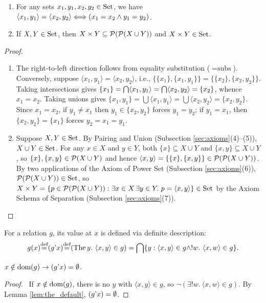 \documentclass[10pt,a4paper]{article}
\renewcommand{\myprf}{\begin{proof}}
\renewcommand{\myqed}{\end{proof}}
\begin{document}
\begin{lemma}\label{lem:pair_prop}
\begin{enumerate}
\item For any sets $x_1, y_1, x_2, y_2 \in {\textrm{Set}}$, we have $\langle x_1, y_1 \rangle = \langle x_2, y_2 \rangle \Longleftrightarrow (x_1 = x_2 \land y_1 = y_2)$.
\item If $X, Y \in {\textrm{Set}}$, then $X \times Y \subseteq {\mathcal{P}}({\mathcal{P}}(X \cup Y))$ and $X \times Y \in {\textrm{Set}}$.
\end{enumerate}
\end{lemma}
\myprf
\begin{enumerate}
\item The right-to-left direction follows from equality substitution ($=\textrm{subs}$). Conversely, suppose $\langle x_1, y_1 \rangle = \langle x_2, y_2 \rangle$, i.e., $\{\{x_1\}, \{x_1, y_1\}\} = \{\{x_2\}, \{x_2, y_2\}\}$. Taking intersections gives $\{x_1\} = {\bigcap} \langle x_1, y_1 \rangle = {\bigcap} \langle x_2, y_2 \rangle = \{x_2\}$, whence $x_1 = x_2$. Taking unions gives $\{x_1, y_1\} = \bigcup \langle x_1, y_1 \rangle = \bigcup \langle x_2, y_2 \rangle = \{x_2, y_2\}$. Since $x_1 = x_2$, if $y_1 \neq x_1$ then $y_1 \in \{x_2, y_2\}$ forces $y_1 = y_2$; if $y_1 = x_1$, then $\{x_2, y_2\} = \{x_1\}$ forces $y_2 = x_1 = y_1$.
\item Suppose $X, Y \in {\textrm{Set}}$. By Pairing and Union (Subsection \ref{sec:axioms}(4)--(5)), $X \cup Y \in {\textrm{Set}}$. For any $x \in X$ and $y \in Y$, both $\{x\} \subseteq X \cup Y$ and $\{x, y\} \subseteq X \cup Y$, so $\{x\}, \{x, y\} \in {\mathcal{P}}(X \cup Y)$ and hence $\langle x, y \rangle = \{\{x\}, \{x, y\}\} \in {\mathcal{P}}({\mathcal{P}}(X \cup Y))$. By two applications of the Axiom of Power Set (Subsection \ref{sec:axioms}(6)), ${\mathcal{P}}({\mathcal{P}}(X \cup Y)) \in {\textrm{Set}}$, so $X \times Y = \{p \in {\mathcal{P}}({\mathcal{P}}(X \cup Y)) : \exists x \in X\, \exists y \in Y.\ p = \langle x, y \rangle\} \in {\textrm{Set}}$ by the Axiom Schema of Separation (Subsection \ref{sec:axioms}(7)).
\end{enumerate}
\myqed

For a relation $g$, its value at $x$ is defined via definite description:
$$g(x) {\stackrel{{\textrm{def}}}{=}} (g{\textrm{'}} x) {\stackrel{{\textrm{def}}}{=}} ({\textrm{The\,}} y.\ \langle x, y\rangle \in g) = {\bigcap} \{y : \langle x,y\rangle \in g \land !w.\ \langle x,w\rangle \in g\}.$$

\begin{exercise}
$x\notin {\textrm{dom}}(g)\to (g{\textrm{'}} x)=\emptyset$.
\end{exercise}
\myprf\ If $x \notin {\textrm{dom}}(g)$, there is no $y$ with $\langle x,y\rangle \in g$, so $\neg(\exists !w.\ \langle x,w\rangle \in g)$. By Lemma \ref{lem:the_default}, $(g{\textrm{'}} x) = \emptyset$. \myqed
\end{document}
